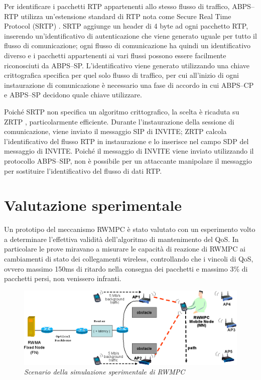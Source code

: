 \documentclass[12pt,a4paper,openright,twoside,draft]{book}
\begin{document}
Per identificare i pacchetti RTP appartenenti allo stesso flusso di
traffico, ABPS--RTP utilizza un'estensione standard di RTP nota come
Secure Real Time Protocol (SRTP) \cite{bib:srtp}. SRTP aggiunge un
header di 4 byte ad ogni pacchetto RTP, inserendo un'identificativo di
autenticazione che viene generato uguale per tutto il flusso di
comunicazione; ogni flusso di comunicazione ha quindi un
identificativo diverso e i pacchetti appartenenti ai vari flussi
possono essere facilmente riconosciuti da ABPS--SP. L'identificativo
viene generato utilizzando una chiave crittografica specifica per quel
solo flusso di traffico, per cui all'inizio di ogni instaurazione di
comunicazione è necessario una fase di accordo in cui ABPS--CP e
ABPS--SP decidono quale chiave utilizzare.

Poiché SRTP non specifica un algoritmo crittografico, la scelta è
ricaduta su ZRTP \cite{bib:zrtp}, particolarmente efficiente. Durante
l'instaurazione della sessione di comunicazione, viene inviato il
messaggio SIP di INVITE; ZRTP calcola l'identificativo del flusso RTP
in instaurazione e lo inserisce nel campo SDP del messaggio di
INVITE. Poiché il messaggio di INVITE viene inviato utilizzando il
protocollo ABPS--SIP, non è possibile per un attaccante manipolare il
messaggio per sostituire l'identificativo del flusso di dati RTP.

\section{Valutazione sperimentale}

Un prototipo del meccanismo RWMPC è stato valutato con un esperimento
volto a determinare l'effettiva validità dell'algoritmo di
mantenimento del QoS. In particolare le prove miravano a misurare le
capacità di reazione di RWMPC ai cambiamenti di stato dei collegamenti
wireless, controllando che i vincoli di QoS, ovvero massimo 150ms di
ritardo nella consegna dei pacchetti e massimo 3\% di pacchetti persi,
non venissero infranti.

\begin{figure}
  \centering
  \includegraphics[width=\textwidth]{img/abps-simulazione}
  \caption{\em Scenario della simulazione sperimentale di RWMPC}
  \label{fig:abps:simulazione}
\end{figure}
\end{document}
